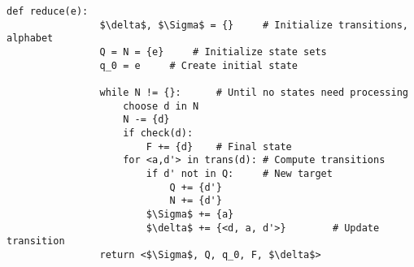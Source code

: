 \documentclass[11pt]{article}
\begin{document}
		\begin{lstlisting}[autogobble=true,mathescape]
			def reduce(e):
				$\delta$, $\Sigma$ = {}		# Initialize transitions, alphabet
				Q = N = {e}		# Initialize state sets
				q_0 = e		# Create initial state
				
				while N != {}:		# Until no states need processing
					choose d in N
					N -= {d}
					if check(d):
						F += {d}	# Final state
					for <a,d'> in trans(d):	# Compute transitions
						if d' not in Q:		# New target
							Q += {d'}
							N += {d'}
						$\Sigma$ += {a}
						$\delta$ += {<d, a, d'>}		# Update transition
				return <$\Sigma$, Q, q_0, F, $\delta$>
		\end{lstlisting}
%		
%		


\end{document}
